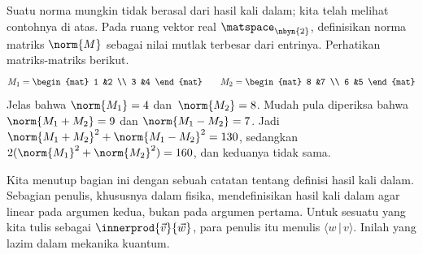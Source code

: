 Suatu norma mungkin tidak berasal dari hasil kali dalam; kita telah melihat
contohnya di atas.
Pada ruang vektor real $\matspace_{\nbyn{2}}$, definisikan norma matriks
$\norm{M}$ sebagai nilai mutlak terbesar dari entrinya.
Perhatikan matriks-matriks berikut.
\begin{equation*}
  M_1=
  \begin{mat}
  1  &2 \\
  3  &4  
  \end{mat}
  \qquad
  M_2=
  \begin{mat}
  8  &7  \\
  6  &5
  \end{mat}
\end{equation*}
Jelas bahwa $\norm{M_1}=4$ dan~$\norm{M_2}=8$.
Mudah pula diperiksa bahwa $\norm{M_1+M_2}=9$ dan
$\norm{M_1-M_2}=7$.
Jadi $\norm{M_1+M_2}^2+\norm{M_1-M_2}^2=130$, sedangkan
$2(\norm{M_1}^2+\norm{M_2}^2)=160$, dan keduanya tidak sama.

Kita menutup bagian ini dengan sebuah catatan tentang definisi hasil kali dalam.
Sebagian penulis, khususnya dalam fisika, mendefinisikan hasil kali dalam agar
linear pada argumen kedua, bukan pada argumen pertama.
Untuk sesuatu yang kita tulis sebagai $\innerprod{\vec{v}}{\vec{w}}$,
para penulis itu menulis $\langle w\, |\, v\rangle$.
Inilah 
yang lazim dalam mekanika kuantum.


